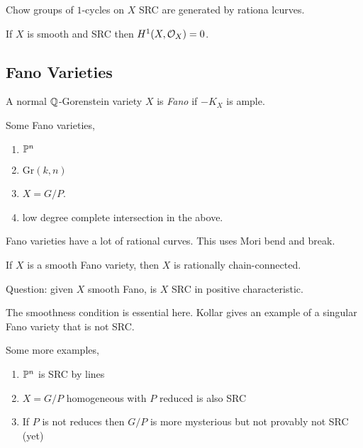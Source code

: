 \documentclass[12pt]{article}
\begin{document}
\begin{thm}
Chow groups of $1$-cycles on $X$ SRC are generated by rationa lcurves.
\end{thm}

\begin{thm}
If $X$ is smooth and SRC then $H^1(X, \struct{X}) = 0$. 
\end{thm}

\subsection{Fano Varieties}

\begin{defn}
A normal $\Q$-Gorenstein variety $X$ is \textit{Fano} if $-K_X$ is ample.
\end{defn}

\begin{example}
Some Fano varieties,
\begin{enumerate}
\item $\P^n$
\item $\mathrm{Gr}(k,n)$
\item $X = G / P$.
\item low degree complete intersection in the above.
\end{enumerate}
\end{example}

Fano varieties have a lot of rational curves. This uses Mori bend and break. 

\begin{prop}
If $X$ is a smooth Fano variety, then $X$ is rationally chain-connected.
\end{prop}

\begin{rmk}
Question: given $X$ smooth Fano, is $X$ SRC in positive characteristic.
\end{rmk}

\begin{rmk}
The smoothness condition is essential here. Kollar gives an example of a singular Fano variety that is not SRC. 
\end{rmk}

\begin{example}
Some more examples,
\begin{enumerate}
\item $\P^n$ is SRC by lines
\item $X = G/P$ homogeneous with $P$ reduced is also SRC
\item If $P$ is not reduces then $G/P$ is more mysterious but not provably not SRC (yet)
\end{enumerate}
\end{example}
\end{document}
